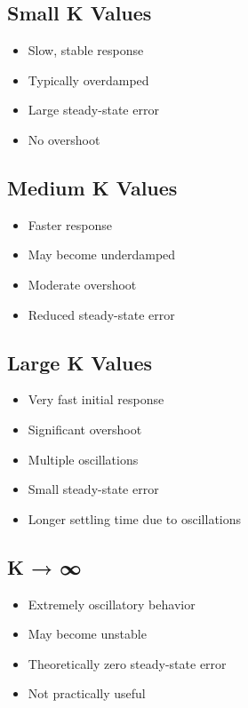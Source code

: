 \documentclass{article}
\begin{document}
\subsection{Small K Values}
\begin{itemize}
    \item Slow, stable response
    \item Typically overdamped
    \item Large steady-state error
    \item No overshoot
\end{itemize}

\subsection{Medium K Values}
\begin{itemize}
    \item Faster response
    \item May become underdamped
    \item Moderate overshoot
    \item Reduced steady-state error
\end{itemize}

\subsection{Large K Values}
\begin{itemize}
    \item Very fast initial response
    \item Significant overshoot
    \item Multiple oscillations
    \item Small steady-state error
    \item Longer settling time due to oscillations
\end{itemize}

\subsection{K → ∞}
\begin{itemize}
    \item Extremely oscillatory behavior
    \item May become unstable
    \item Theoretically zero steady-state error
    \item Not practically useful
\end{itemize}
\end{document}
